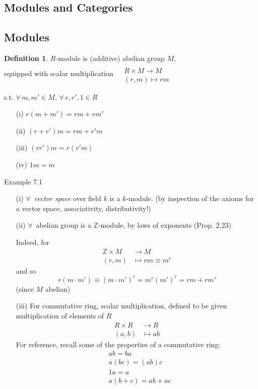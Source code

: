 \documentclass[twoside,landscape]{amsart}
\theoremstyle{plain}
\theoremstyle{definition}
\newtheorem{definition}{Definition}
\theoremstyle{remark}
\begin{document}
\begin{multicols*}{2}
\section{Modules and Categories }

\subsection{Modules}

\begin{definition}
  $R$-module is (additive) abelian group $M$, \\
equipped with scalar multiplication $\begin{aligned} & \quad \\
  & R \times M \to M \\
  & (r,m) \mapsto rm \end{aligned}$ 

s.t. $\forall \, m,m' \in M$, $\forall \, r,r',1 \in R$
\begin{enumerate}
  \item[(i)] $r(m+m')=rm+rm'$
  \item[(ii)] $(r+r')m = rm+r'm$
  \item[(iii)] $(rr')m = r(r'm)$
  \item[(iv)] $1m = m$
\end{enumerate}
\end{definition}

Example 7.1 \begin{enumerate}
\item[(i)] $\forall \, $ \emph{vector space} over field $k$ is a $k$-module.  (by inspection of the axioms for a vector space, associativity, distributivity!)
\item[(ii)] $\forall \, $ abelian group is a $\mathbb{Z}$-module, by laws of exponents (Prop. 2.23)

  Indeed, for
  \[
\begin{aligned}
  \mathbb{Z} \times M & \to M \\ 
  (r,m) & \mapsto rm \equiv m^r 
  \end{aligned}
\]
and so
\[
r(m\cdot m') \equiv (m\cdot m')^r = m^r (m')^r = rm + rm' 
\]
(since $M$ abelian)
\item[(iii)] For commutative ring, scalar multiplication, defined to be given multiplication of elements of $R$
  \[
\begin{aligned}
  R\times R & \to R \\
 (a,b) & \mapsto ab 
  \end{aligned}
\]
For reference, recall some of the properties of a commutative ring:
\[
\begin{aligned}
  & ab = ba \\ 
  & a(bc) = (ab)c \\ 
  & 1a = a \\ 
  & a(b+c) = ab + ac
  \end{aligned}
\]


\end{enumerate}
\end{multicols*}
\end{document}
